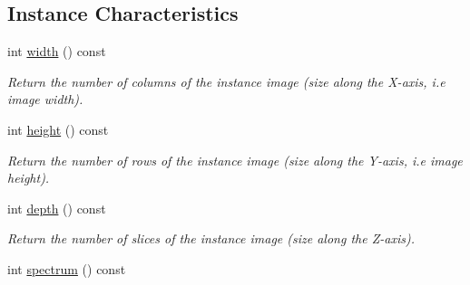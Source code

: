 \subsection*{Instance Characteristics}
\label{_amgrp793b2d5051efe1cb9227216131875e3a}
 \begin{DoxyCompactItemize}
\item 
\hypertarget{structcimg__library_1_1CImg_a369399896761e31ae71db57fdd0ba431}{
int \hyperlink{structcimg__library_1_1CImg_a369399896761e31ae71db57fdd0ba431}{width} () const }
\label{structcimg__library_1_1CImg_a369399896761e31ae71db57fdd0ba431}

\begin{DoxyCompactList}\small\item\em Return the number of columns of the instance image (size along the X-\/axis, i.e image width). \item\end{DoxyCompactList}\item 
\hypertarget{structcimg__library_1_1CImg_ae26bcfe2f33f5873dbdfb6948cf1f59f}{
int \hyperlink{structcimg__library_1_1CImg_ae26bcfe2f33f5873dbdfb6948cf1f59f}{height} () const }
\label{structcimg__library_1_1CImg_ae26bcfe2f33f5873dbdfb6948cf1f59f}

\begin{DoxyCompactList}\small\item\em Return the number of rows of the instance image (size along the Y-\/axis, i.e image height). \item\end{DoxyCompactList}\item 
\hypertarget{structcimg__library_1_1CImg_a3275d1392d01b26af1c8cd52b0d10745}{
int \hyperlink{structcimg__library_1_1CImg_a3275d1392d01b26af1c8cd52b0d10745}{depth} () const }
\label{structcimg__library_1_1CImg_a3275d1392d01b26af1c8cd52b0d10745}

\begin{DoxyCompactList}\small\item\em Return the number of slices of the instance image (size along the Z-\/axis). \item\end{DoxyCompactList}\item 
\hypertarget{structcimg__library_1_1CImg_acd2ee207fa512e34b45ff548082f70ba}{
int \hyperlink{structcimg__library_1_1CImg_acd2ee207fa512e34b45ff548082f70ba}{spectrum} () const }
\label{structcimg__library_1_1CImg_acd2ee207fa512e34b45ff548082f70ba}


\end{DoxyCompactItemize}
